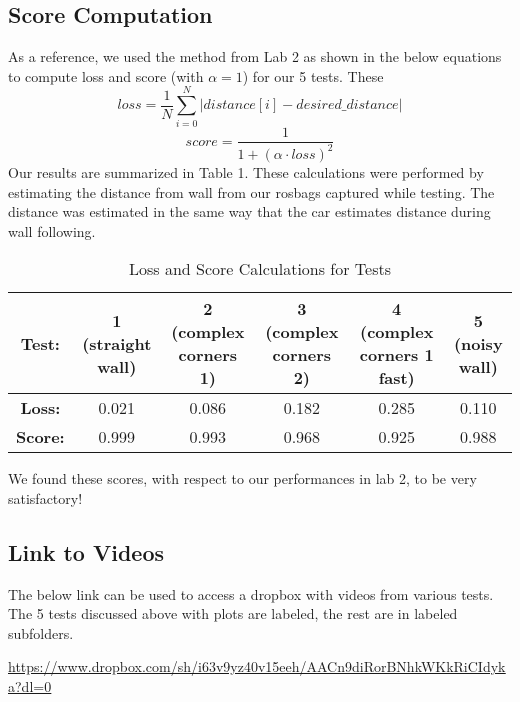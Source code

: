 \documentclass{article}
\begin{document}
\subsection{Score Computation}
As a reference, we used the method from Lab 2 as shown in the below equations to compute loss and score (with $\alpha=1$) for our 5 tests. These 
\begin{equation}
    loss = \frac{1}{N}\sum_{i=0}^N|distance[i]-desired\_distance|
\end{equation}
\begin{equation}
    score=\frac{1}{1+(\alpha \cdot loss)^2}
\end{equation}
Our results are summarized in Table 1. These calculations were performed by estimating the distance from wall from our rosbags captured while testing. The distance was estimated in the same way that the car estimates distance during wall following. 

\begin{center}
\begin{table}[H]
{\footnotesize
\begin{tabular}{|c|c|c|c|c|c|}
\hline
\textbf{Test:}  & 1 (straight wall) & 2 (complex corners 1) & 3 (complex corners 2) & 4 (complex corners 1 fast) & 5 (noisy wall) \\ \hline
\textbf{Loss:}  & 0.021             & 0.086                 & 0.182                 & 0.285                      & 0.110          \\ \hline
\textbf{Score:} & 0.999             & 0.993                 & 0.968                 & 0.925                      & 0.988          \\ \hline
\end{tabular}
}
\caption{Loss and Score Calculations for Tests}
\end{table}
\end{center}
We found these scores, with respect to our performances in lab 2, to be very satisfactory! 


\subsection{Link to Videos}

The below link can be used to access a dropbox with videos from various tests. The 5 tests discussed above with plots are labeled, the rest are in labeled subfolders. 
\begin{center} \href{https://www.dropbox.com/sh/i63v9yz40v15eeh/AACn9diRorBNhkWKkRiCIdyka?dl=0}{\underline{https://www.dropbox.com/sh/i63v9yz40v15eeh/AACn9diRorBNhkWKkRiCIdyka?dl=0}}
\end{center}
\end{document}
